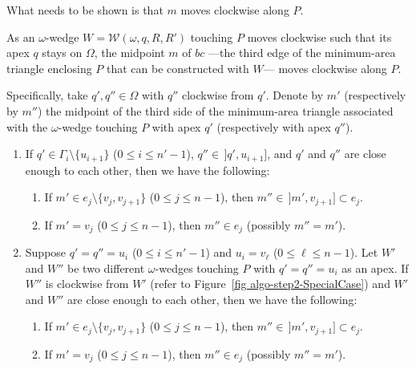 \documentclass[11pt, oneside]{article}
\def\wedge{\mathcal{W}}
\begin{document}
What needs to be shown
is that $m$ moves clockwise along $P$.
\begin{lemma}
\label{lemma q turns clockwise and so does m}
As an $\omega$-wedge $W=\wedge(\omega,q,R,R')$ touching $P$ moves clockwise
such that its apex $q$ stays on $\Omega$,
the midpoint $m$ of $bc$ 
---the third edge of the minimum-area triangle enclosing $P$
that can be constructed with $W$---
moves clockwise along $P$.

Specifically,
take $q',q'' \in \Omega$
with $q''$ clockwise from $q'$.
Denote by $m'$
(respectively by $m''$)
the midpoint of the third side of the minimum-area triangle
associated with the $\omega$-wedge touching $P$ with apex $q'$
(respectively with apex $q''$).
\begin{enumerate}
\item\label{lemma q turns clockwise and so does m item q' neq q''} 
If $q'\in \Gamma_i\setminus\{u_{i+1}\}$ ($0\leq i \leq n'-1$),
$q''\in\,]q',u_{i+1}]$,
and $q'$ and $q''$ are close enough to each other,
then we have the following:
\begin{enumerate}
\item\label{lemma q turns clockwise and so does m item q' neq q'' item m' neq m''}  
If $m'\in e_j \setminus \{v_j,v_{j+1}\}$ ($0\leq j \leq n-1$),
then $m'' \in\, ]m',v_{j+1}]\subset e_j$.

\item If $m'=v_j$ ($0\leq j \leq n-1$),
then $m''\in e_j$
(possibly $m''=m'$).
\end{enumerate}

\item\label{lemma q turns clockwise and so does m item q' = q'' = ui}
Suppose $q'=q''=u_i$ ($0\leq i \leq n'-1$)
and $u_i=v_{\ell}$ ($0\leq \ell \leq n-1$).
Let $W'$ and $W''$ be two different $\omega$-wedges
touching $P$ with $q'=q''=u_i$ as an apex.
If $W''$ is clockwise from $W'$
(refer to Figure~\ref{fig algo-step2-SpecialCase})
and $W'$ and $W''$ are close enough to each other,
then we have the following:
\begin{enumerate}
\item If $m'\in e_j \setminus \{v_j,v_{j+1}\}$ ($0\leq j \leq n-1$),
then $m'' \in\, ]m',v_{j+1}]\subset e_j$.

\item If $m'=v_j$ ($0\leq j \leq n-1$),
then $m''\in e_j$
(possibly $m''=m'$).
\end{enumerate} 
\end{enumerate}
\end{lemma}
\end{document}
